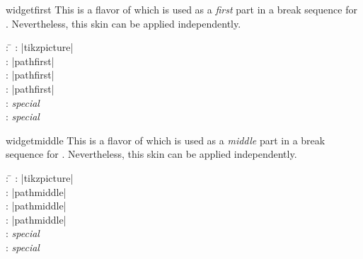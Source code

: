 \clearpage

\begin{docSkin}{widgetfirst}
This is a flavor of  which is used as a \emph{first} part
in a break sequence for .
Nevertheless, this skin can be applied independently.
\begin{tcolorbox}[skintable=widgetfirst]
  \begin{tabbing}
    : \=\kill
    :  \> |tikzpicture|\\ 
    :           \> |pathfirst|\\
    : \> |pathfirst|\\ 
    :        \> |pathfirst|\\
    :    \> \emph{special}\\
    :           \> \emph{special}
  \end{tabbing}
\end{tcolorbox}
\end{docSkin}


\begin{dispExample}
\end{dispExample}

\medskip

\begin{docSkin}{widgetmiddle}
This is a flavor of  which is used as a \emph{middle} part
in a break sequence for .
Nevertheless, this skin can be applied independently.
\begin{tcolorbox}[skintable=widgetmiddle]
  \begin{tabbing}
    : \=\kill
    :  \> |tikzpicture|\\ 
    :           \> |pathmiddle|\\
    : \> |pathmiddle|\\ 
    :        \> |pathmiddle|\\
    :    \> \emph{special}\\
    :           \> \emph{special}
  \end{tabbing}
\end{tcolorbox}
\end{docSkin}

